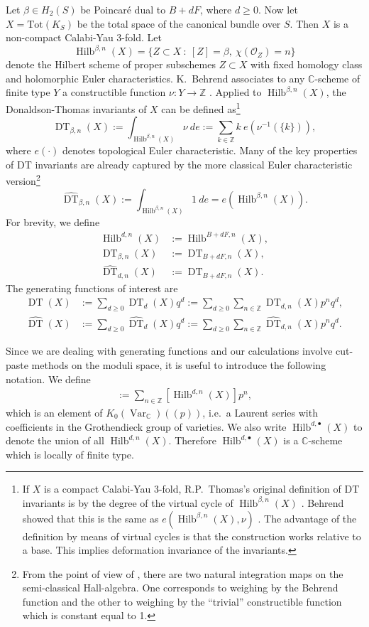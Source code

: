 \documentclass{amsart}
\theoremstyle{definition}
\newcommand{\CC} {\mathbb{C}}          %
\newcommand{\ZZ} {\mathbb{Z}}		%
\renewcommand{\O}{\mathcal{O}}
\newcommand{\Hilb}{\operatorname{Hilb}}
\newcommand{\DT}{\operatorname{DT}}
\newcommand{\Var}{\operatorname{Var}}
\begin{document}
Let $\beta \in H_2(S)$ be Poincar\'e dual to $B+dF$, where $d \geq 0$. 
Now let $X = \mathrm{Tot}(K_S)$ be the total space of the canonical bundle over $S$. Then $X$ is a non-compact Calabi-Yau 3-fold. Let
$$
\Hilb^{\beta,n}(X) = \{ Z \subset X \ : \ [Z] = \beta, \ \chi(\O_Z) = n\}
$$
denote the Hilbert scheme of proper subschemes $Z \subset X$ with fixed homology class and holomorphic Euler characteristics. K.~Behrend associates to any $\CC$-scheme of finite type $Y$ a constructible function $\nu : Y \rightarrow \ZZ$ \cite{Beh}. Applied to $\Hilb^{\beta,n}(X)$, the Donaldson-Thomas invariants of $X$ can be defined as\footnote{If $X$ is a compact Calabi-Yau 3-fold, R.P.~Thomas's original definition of DT invariants is by the degree of the virtual cycle of $\Hilb^{\beta,n}(X)$ \cite{Tho}. Behrend showed that this is the same as $e(\Hilb^{\beta,n}(X),\nu)$ \cite{Beh}. The advantage of the definition by means of virtual cycles is that the construction works relative to a base. This implies deformation invariance of the invariants.} 
$$
\DT_{\beta,n}(X) := \int_{\Hilb^{\beta,n}(X)} \nu \ de := \sum_{k \in \ZZ} k \ e(\nu^{-1}(\{k\})),
$$
where $e(\cdot)$ denotes topological Euler characteristic. Many of the key properties of DT invariants are already captured by the more classical Euler characteristic version\footnote{From the point of view of \cite{Joy, Bri}, there are two natural integration maps on the semi-classical Hall-algebra. One corresponds to weighing by the Behrend function and the other to weighing by the ``trivial'' constructible function which is constant equal to 1.}
$$
\widehat{\DT}_{\beta,n}(X) := \int_{\Hilb^{\beta,n}(X)} 1 \ de = e(\Hilb^{\beta,n}(X)).
$$
For brevity, we define
\begin{align*}
\Hilb^{d,n}(X) &:=\Hilb^{B+dF,n}(X), \\
\DT_{\beta,n}(X) &:= \DT_{B+dF,n}(X), \\
\widehat{\DT}_{d,n}(X) &:= \DT_{B+dF,n}(X).
\end{align*}
The generating functions of interest are
\begin{align*}
\DT(X) &:= \sum_{d \geq 0} \DT_d(X) q^d := \sum_{d \geq 0} \sum_{n \in \ZZ} \DT_{d,n}(X) p^n q^d, \\
\widehat{\DT}(X) &:= \sum_{d \geq 0} \widehat{\DT}_d(X) q^d := \sum_{d \geq 0} \sum_{n \in \ZZ} \widehat{\DT}_{d,n}(X) p^n q^d.
\end{align*}

Since we are dealing with generating functions and our calculations involve cut-paste methods on the moduli space, it is useful to introduce the following notation. We define
\begin{align*}
[\Hilb^{d,\bullet}(X)] := \sum_{n \in \ZZ} [\Hilb^{d,n}(X)] p^n,
\end{align*}
which is an element of $K_0(\Var_{\CC})(\!(p)\!)$, i.e.~a Laurent series with coefficients in the Grothendieck group of varieties. We also write $\Hilb^{d,\bullet}(X)$ to denote the union of all $\Hilb^{d,n}(X)$. Therefore $\Hilb^{d,\bullet}(X)$ is a $\CC$-scheme which is locally of finite type.
\end{document}
